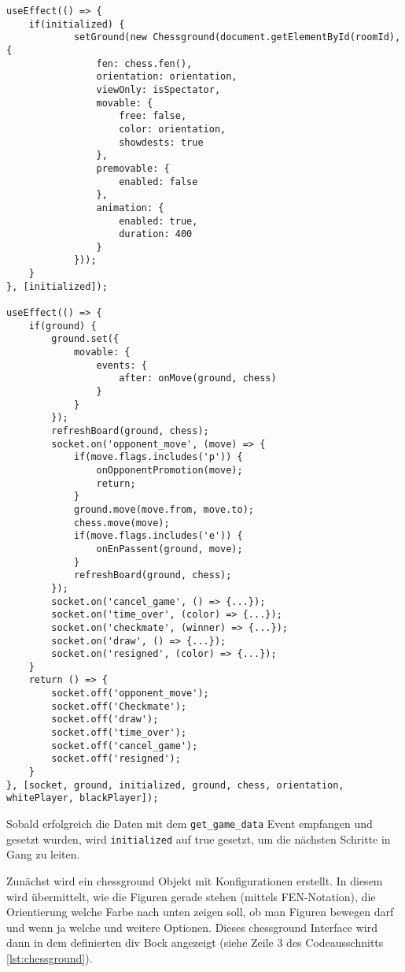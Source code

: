 \begin{lstlisting}[style=codeStyle, caption={Initialisierung des Schachspiels nach Empfangen der Daten}, label={lst:chessground}]
useEffect(() => {
    if(initialized) {
            setGround(new Chessground(document.getElementById(roomId), {
                fen: chess.fen(),
                orientation: orientation,
                viewOnly: isSpectator,
                movable: {
                    free: false,
                    color: orientation,
                    showdests: true
                },
                premovable: {
                    enabled: false
                },
                animation: {
                    enabled: true,
                    duration: 400
                }
            }));
    }
}, [initialized]);
    
useEffect(() => {
    if(ground) {
        ground.set({
            movable: {
                events: {
                    after: onMove(ground, chess)
                }
            }
        });
        refreshBoard(ground, chess);        
        socket.on('opponent_move', (move) => {
            if(move.flags.includes('p')) {
                onOpponentPromotion(move);
                return;
            }
            ground.move(move.from, move.to);
            chess.move(move);
            if(move.flags.includes('e')) {
                onEnPassent(ground, move);
            }
            refreshBoard(ground, chess);
        });
        socket.on('cancel_game', () => {...});
        socket.on('time_over', (color) => {...});
        socket.on('checkmate', (winner) => {...});
        socket.on('draw', () => {...});
        socket.on('resigned', (color) => {...});
    }
    return () => {
        socket.off('opponent_move');
        socket.off('Checkmate');
        socket.off('draw');
        socket.off('time_over');
        socket.off('cancel_game');
        socket.off('resigned');
    }
}, [socket, ground, initialized, ground, chess, orientation, whitePlayer, blackPlayer]);
\end{lstlisting}

Sobald erfolgreich die Daten mit dem \verb|get_game_data| Event empfangen und gesetzt wurden, wird \verb|initialized| auf true gesetzt, um die nächsten Schritte in Gang zu leiten.

Zunächst wird ein chessground Objekt mit Konfigurationen erstellt. In diesem wird übermittelt, wie die Figuren gerade stehen (mittels FEN-Notation), die Orientierung welche Farbe nach unten zeigen soll, ob man Figuren bewegen darf und wenn ja welche und weitere Optionen. Dieses chessground Interface wird dann in dem definierten div Bock angezeigt (siehe Zeile 3 des Codeausschnitts \ref{lst:chessground}).

